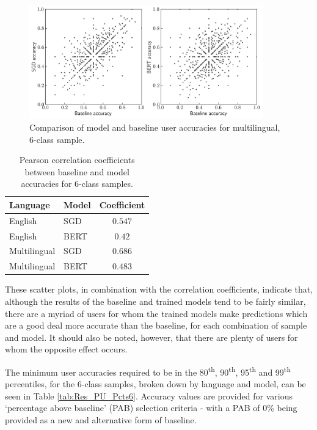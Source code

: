 \begin{figure}[ht]
    \centering
    \includegraphics[width=0.9\textwidth]{figures/06_results/02_pu/04_scatter/any_6.png}
    \caption{Comparison of model and baseline user accuracies for multilingual, 6-class sample.}
    \label{fig:Res_PU_ScatterMul}
\end{figure}

\begin{table}[ht]
    \centering
    \begin{tabular}{l l | c}
        \toprule
        \textbf{Language}&\textbf{Model}&\textbf{Coefficient}\\\midrule
        English&SGD&$0.547$\\
        English&BERT&$0.42$\\\midrule
        Multilingual&SGD&$0.686$\\
        Multilingual&BERT&$0.483$\\
        \bottomrule
    \end{tabular}
    \caption{Pearson correlation coefficients between baseline and model accuracies for 6-class samples.}
    \label{tab:Res_PU_Corrs}
\end{table}

These scatter plots, in combination with the correlation coefficients, indicate that, although the results of the baseline and trained models tend to be fairly similar, there are a myriad of users for whom the trained models make predictions which are a good deal more accurate than the baseline, for each combination of sample and model. It should also be noted, however, that there are plenty of users for whom the opposite effect occurs.

The minimum user accuracies required to be in the 80\textsuperscript{th}, 90\textsuperscript{th}, 95\textsuperscript{th} and 99\textsuperscript{th} percentiles, for the 6-class samples, broken down by language and model, can be seen in Table \ref{tab:Res_PU_Pcts6}. Accuracy values are provided for various `percentage above baseline' (PAB) selection criteria - with a PAB of 0\% being provided as a new and alternative form of baseline.

